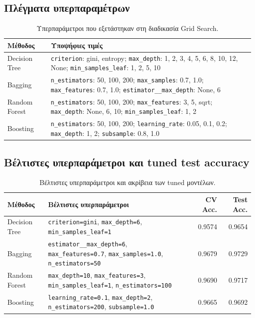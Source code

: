 \documentclass[12pt,a4paper]{article}
\newcommand{\code}[1]{\texttt{\textenglish{#1}}}
\begin{document}
\subsection{Πλέγματα υπερπαραμέτρων}

\begin{table}[H]
\centering
\caption{Υπερπαράμετροι που εξετάστηκαν στη διαδικασία Grid Search.}
\small
\begin{tabular}{p{3.2cm}p{10.5cm}}
\toprule
\textbf{Μέθοδος} & \textbf{Υποψήφιες τιμές} \\
\midrule
Decision Tree &
\code{criterion}: gini, entropy;
\code{max\_depth}: 1, 2, 3, 4, 5, 6, 8, 10, 12, None;
\code{min\_samples\_leaf}: 1, 2, 5, 10 \\
\addlinespace
Bagging &
\code{n\_estimators}: 50, 100, 200;
\code{max\_samples}: 0.7, 1.0;
\code{max\_features}: 0.7, 1.0;
\code{estimator\_\_max\_depth}: None, 6 \\
\addlinespace
Random Forest &
\code{n\_estimators}: 50, 100, 200;
\code{max\_features}: 3, 5, sqrt;
\code{max\_depth}: None, 6, 10;
\code{min\_samples\_leaf}: 1, 2 \\
\addlinespace
Boosting &
\code{n\_estimators}: 50, 100, 200;
\code{learning\_rate}: 0.05, 0.1, 0.2;
\code{max\_depth}: 1, 2;
\code{subsample}: 0.8, 1.0 \\
\bottomrule
\end{tabular}
\end{table}

\subsection{Βέλτιστες υπερπαράμετροι και tuned test accuracy}

\begin{table}[H]
\centering
\caption{Βέλτιστες υπερπαράμετροι και ακρίβεια των tuned μοντέλων.}
\small
\begin{tabular}{p{2.8cm}p{7.9cm}rr}
\toprule
\textbf{Μέθοδος} & \textbf{Βέλτιστες υπερπαράμετροι} & \textbf{CV Acc.} & \textbf{Test Acc.} \\
\midrule
Decision Tree &
\code{criterion=gini}, \code{max\_depth=6}, \code{min\_samples\_leaf=1} &
0.9574 & 0.9654 \\
\addlinespace
Bagging &
\code{estimator\_\_max\_depth=6}, \code{max\_features=0.7}, \code{max\_samples=1.0}, \code{n\_estimators=50} &
0.9679 & 0.9729 \\
\addlinespace
Random Forest &
\code{max\_depth=10}, \code{max\_features=3}, \code{min\_samples\_leaf=1}, \code{n\_estimators=100} &
0.9690 & 0.9717 \\
\addlinespace
Boosting &
\code{learning\_rate=0.1}, \code{max\_depth=2}, \code{n\_estimators=200}, \code{subsample=1.0} &
0.9665 & 0.9692 \\
\bottomrule
\end{tabular}
\end{table}
\end{document}
